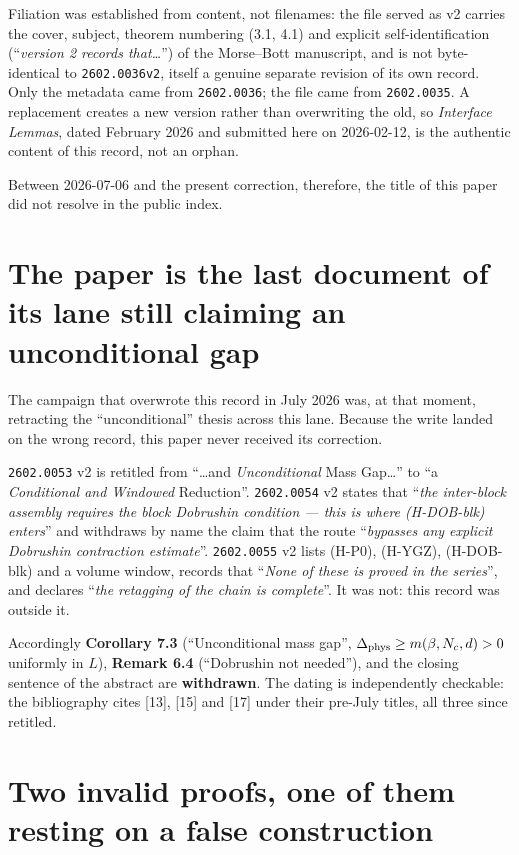 \documentclass[11pt]{article}
\begin{document}
\noindent
Filiation was established from content, not filenames: the file served as v2 carries
the cover, subject, theorem numbering (3.1, 4.1) and explicit self-identification
(``\emph{version 2 records that\ldots}'') of the Morse--Bott manuscript, and is not
byte-identical to \texttt{2602.0036v2}, itself a genuine separate revision of its own
record. Only the metadata came from \texttt{2602.0036}; the file came from
\texttt{2602.0035}. A replacement creates a new version rather than overwriting the
old, so \emph{Interface Lemmas}, dated February 2026 and submitted here on
2026-02-12, is the authentic content of this record, not an orphan.

Between 2026-07-06 and the present correction, therefore, the title of this paper did
not resolve in the public index.

\section{The paper is the last document of its lane still claiming an unconditional gap}

The campaign that overwrote this record in July 2026 was, at that moment, retracting
the ``unconditional'' thesis across this lane. Because the write landed on the wrong
record, this paper never received its correction.

\texttt{2602.0053} v2 is retitled from ``\ldots and \emph{Unconditional} Mass
Gap\ldots'' to ``a \emph{Conditional and Windowed} Reduction''. \texttt{2602.0054} v2
states that ``\emph{the inter-block assembly requires the block Dobrushin condition
--- this is where {\rm(H-DOB-blk)} enters}'' and withdraws by name the claim that the
route ``\emph{bypasses any explicit Dobrushin contraction estimate}''.
\texttt{2602.0055} v2 lists (H-P0), (H-YGZ), (H-DOB-blk) and a volume window,
records that ``\emph{None of these is proved in the series}'', and declares ``\emph{the
retagging of the chain is complete}''. It was not: this record was outside it.

Accordingly \textbf{Corollary 7.3} (``Unconditional mass gap'',
$\Delta_{\rm phys}\ge m(\beta,N_c,d)>0$ uniformly in $L$), \textbf{Remark 6.4}
(``Dobrushin not needed''), and the closing sentence of the abstract are
\textbf{withdrawn}. The dating is independently checkable: the bibliography cites
[13], [15] and [17] under their pre-July titles, all three since retitled.

\section{Two invalid proofs, one of them resting on a false construction}
\end{document}
